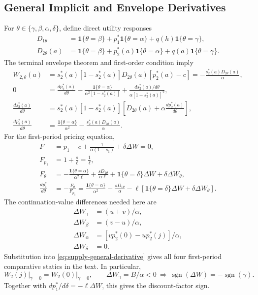 \documentclass[12pt]{article}
\theoremstyle{definition}
\theoremstyle{remark}
\begin{document}
\subsection{General Implicit and Envelope Derivatives}
For $\theta\in\{\gamma,\beta,\alpha,\delta\}$, define direct utility responses
\begin{align}
 D_{1\theta}&=\mathbf{1}\{\theta=\beta\}
 +p_1^*\mathbf{1}\{\theta=\alpha\}+q(h)\mathbf{1}\{\theta=\gamma\},\\
 D_{2\theta}(a)&=\mathbf{1}\{\theta=\beta\}
 +p_2^*(a)\mathbf{1}\{\theta=\alpha\}+q(a)\mathbf{1}\{\theta=\gamma\}.
\end{align}
The terminal envelope theorem and first-order condition imply
\begin{align}
 W_{2,\theta}(a)
 &=s_2^*(a)[1-s_2^*(a)]D_{2\theta}(a)[p_2^*(a)-c]
 =-\frac{s_2^*(a)D_{2\theta}(a)}{\alpha},\\
 0&=\frac{dp_2^*(a)}{d\theta}
 -\frac{\mathbf{1}\{\theta=\alpha\}}{\alpha^2[1-s_2^*(a)]}
 +\frac{ds_2^*(a)/d\theta}{\alpha[1-s_2^*(a)]^2},\\
 \frac{ds_2^*(a)}{d\theta}
 &=s_2^*(a)[1-s_2^*(a)]\left[D_{2\theta}(a)
 +\alpha\frac{dp_2^*(a)}{d\theta}\right],\\
 \frac{dp_2^*(a)}{d\theta}
 &=\frac{\mathbf{1}\{\theta=\alpha\}}{\alpha^2}
 -\frac{s_2^*(a)D_{2\theta}(a)}{\alpha}.
\end{align}
For the first-period pricing equation,
\begin{align}
 F&=p_1-c+\frac{1}{\alpha(1-s_1)}+\delta\Delta W=0,\\
 F_{p_1}&=1+\frac{s}{\ell}=\frac{1}{\ell},\\
 F_\theta&=-\frac{\mathbf{1}\{\theta=\alpha\}}{\alpha^2\ell}
 +\frac{sD_{1\theta}}{\alpha\ell}
 +\mathbf{1}\{\theta=\delta\}\Delta W+\delta\Delta W_\theta,\\
 \frac{dp_1^*}{d\theta}&=-\frac{F_\theta}{F_{p_1}}
 =\frac{\mathbf{1}\{\theta=\alpha\}}{\alpha^2}
 -\frac{sD_{1\theta}}{\alpha}
 -\ell[\mathbf{1}\{\theta=\delta\}\Delta W+\delta\Delta W_\theta].
 \label{eq:supply-general-derivative}
\end{align}
The continuation-value differences needed here are
\begin{align}
 \Delta W_\gamma&=(u+v)/\alpha,\\
 \Delta W_\beta&=(v-u)/\alpha,\\
 \Delta W_\alpha&=[vp_2^*(0)-up_2^*(j)]/\alpha,\\
 \Delta W_\delta&=0.
\end{align}
Substitution into \eqref{eq:supply-general-derivative} gives all four
first-period comparative statics in the text. In particular,
\begin{equation}
 W_2(j)\big|_{\gamma=0}=W_2(0)\big|_{\gamma=0},\qquad
 \Delta W_\gamma=B/\alpha<0
 \ \Longrightarrow\ \operatorname{sgn}(\Delta W)=-\operatorname{sgn}(\gamma).
\end{equation}
Together with $dp_1^*/d\delta=-\ell\Delta W$, this gives the discount-factor sign.
\end{document}
